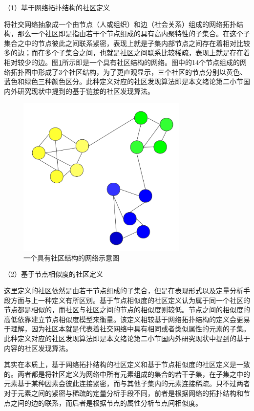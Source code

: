 （1）基于网络拓扑结构的社区定义

将社交网络抽象成一个由节点（人或组织）和边（社会关系）组成的网络拓扑结构，那么一个社区即是指由若干个节点组成的具有高内聚特性的子集合。在这个子集合之中的节点彼此之间联系紧密，表现上就是子集内部节点之间存在着相对比较多的边；而在多个子集合之间，也就是社区之间联系比较稀疏，表现上就是存在着相对较少的边。图\ref{fig:fig2-3}所示即是一个具有社区结构的网络。图中的14个节点组成的网络拓扑图中形成了3个社区结构，为了更直观显示，三个社区的节点分别以黄色、蓝色和绿色三种颜色区分。此种定义对应的社区发现算法即是本文绪论第二小节国内外研究现状中提到的基于链接的社区发现算法。

\begin{figure}
  \centering
  \includegraphics[width=0.75\textwidth]{figures/fig2-3}
  \caption{一个具有社区结构的网络示意图}\label{fig:fig2-3}
\end{figure}

（2）基于节点相似度的社区定义

这里定义的社区依然是由若干节点组成的子集合，但是在表现形式以及定量分析手段方面与上一种定义有所区别。基于节点相似度的社区定义认为属于同一个社区的节点都是相似的，而社区与社区之间的节点的相似度则较低。节点之间的相似度的高低依靠建立节点相似度模型来衡量。该定义相较基于网络拓扑结构的定义会更易于理解，因为社区本就是代表着社交网络中具有相同或者类似属性的元素的子集。此种定义对应的社区发现算法即是本文绪论第二小节国内外研究现状中提到的基于内容的社区发现算法。

其实在本质上，基于网络拓扑结构的社区定义和基于节点相似度的社区定义是一致的。两者都是将社区定义为网络中所有元素组成的集合的若干子集，在子集之中的元素基于某种因素会彼此连接紧密，而与其他子集内的元素连接稀疏。只不过两者对于元素之间的紧密与稀疏的定量分析手段不同，前者是根据网络的拓扑结构和节点之间的边的联系，而后者是根据节点的属性分析节点间相似度。

